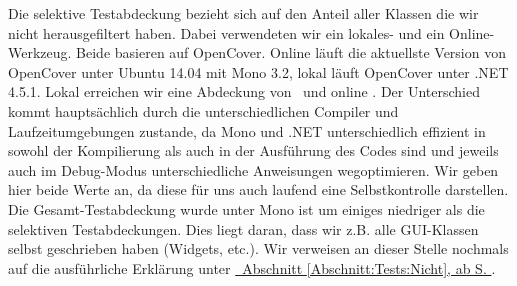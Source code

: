 Die selektive Testabdeckung bezieht sich auf den Anteil aller Klassen die wir nicht herausgefiltert haben. Dabei verwendeten wir ein lokales- und ein Online-Werkzeug.
Beide basieren auf OpenCover. Online läuft die aktuellste Version von OpenCover unter Ubuntu 14.04 mit Mono 3.2, lokal läuft OpenCover unter .NET 4.5.1.
Lokal erreichen wir eine Abdeckung von \VSLocalCoverage~und online \OnlineLocalCoverage.
Der Unterschied kommt hauptsächlich durch die unterschiedlichen Compiler und Laufzeitumgebungen zustande, da Mono und .NET unterschiedlich effizient in sowohl der
Kompilierung als auch in der Ausführung des Codes sind und jeweils auch im Debug-Modus unterschiedliche Anweisungen wegoptimieren.
Wir geben hier beide Werte an, da diese für uns auch laufend eine Selbstkontrolle darstellen.
Die Gesamt-Testabdeckung wurde unter Mono ist um einiges niedriger als die selektiven Testabdeckungen.
Dies liegt daran, dass wir z.B. alle GUI-Klassen selbst geschrieben haben (Widgets, etc.).
Wir verweisen an dieser Stelle nochmals auf die ausführliche Erklärung unter \hyperref[Abschnitt:Tests:Nicht]{\mousecursor~Abschnitt \ref{Abschnitt:Tests:Nicht}, ab S. \pageref{Abschnitt:Tests:Nicht}}.



\thispagestyle{empty}
\pagestyle{empty}

